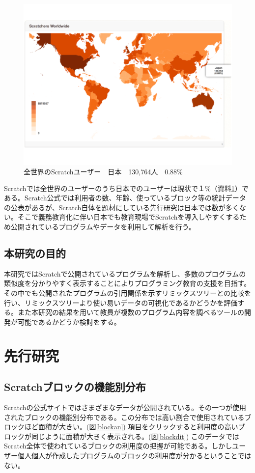 \documentclass[a4paper,10pt,onecolumn,oneside,openany]{jsbook}
\begin{document}
\begin{figure}[h]
  \centering
    \includegraphics[scale=0.4]{graphic/world_japan.pdf}
  \caption{全世界のScratchユーザー　日本　130,764人　0.88\%}
  \label{num}
\end{figure}

Scratchでは全世界のユーザーのうち日本でのユーザーは現状で１\%（資料\ref{num}）である。Scratch公式では利用者の数、年齢、使っているブロック等の統計データの公表があるが、Scratch自体を題材にしている先行研究は日本では数が多くない。そこで義務教育化に伴い日本でも教育現場でScratchを導入しやすくするため公開されているプログラムやデータを利用して解析を行う。

\newpage
\section{本研究の目的}

本研究ではScratchで公開されているプログラムを解析し、多数のプログラムの類似度を分かりやすく表示することによりプログラミング教育の支援を目指す。その中でも公開されたプログラムの引用関係を示すリミックスツリーとの比較を行い、リミックスツリーより使い易いデータの可視化であるかどうかを評価する。また本研究の結果を用いて教員が複数のプログラム内容を調べるツールの開発が可能であるかどうか検討をする。
\chapter{先行研究}
\section{Scratchブロックの機能別分布}
Scratchの公式サイトではさまざまなデータが公開されている。その一つが使用されたブロックの機能別分布である。この分布では高い割合で使用されているブロックほど面積が大きい。(図\ref{blockan})
 項目をクリックすると利用度の高いブロックが同じように面積が大きく表示される。(図\ref{blockdit}) 
 このデータではScratch全体で使われているブロックの利用度の把握が可能である。しかしユーザー個人個人が作成したプログラムのブロックの利用度が分かるということではない。
 
\end{document}
